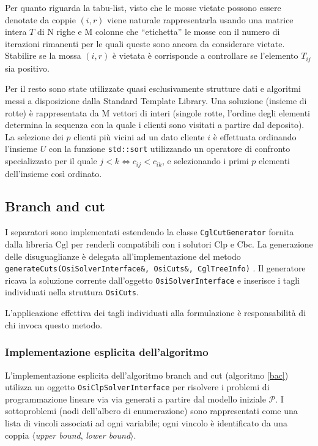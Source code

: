\documentclass[11pt,oneside,a4paper]{article}
\begin{document}
Per quanto riguarda la tabu-list, visto che le mosse vietate possono essere denotate da coppie
$(i,r)$ viene naturale rappresentarla usando una matrice intera $T$ di N righe e M colonne
che ``etichetta'' le mosse con il numero di iterazioni rimanenti per le quali queste sono ancora da
considerare vietate. Stabilire se la mossa $(i,r)$ è vietata è corrisponde a controllare se
l'elemento $T_{ij}$ sia positivo.

Per il resto sono state utilizzate quasi esclusivamente strutture dati e algoritmi messi a
disposizione dalla Standard Template Library. Una soluzione (insieme di rotte) è rappresentata da M vettori
di interi (singole rotte, l'ordine degli elementi determina la sequenza con la quale i clienti sono visitati
a partire dal deposito). La selezione dei $p$ clienti più vicini ad un dato cliente $i$ è effettuata
ordinando l'insieme $U$ con la funzione \texttt{std::sort} utilizzando un operatore di
confronto specializzato per il quale $j<k \iff c_{ij} < c_{ik}$, e selezionando i primi 
$p$ elementi dell'insieme così ordinato.

\subsection{Branch and cut}
I separatori sono implementati estendendo la classe \texttt{CglCutGenerator} fornita dalla
libreria Cgl per renderli compatibili con i solutori Clp e Cbc. La generazione
delle disuguaglianze è delegata all'implementazione del metodo
\texttt{generateCuts(OsiSolverInterface\&, OsiCuts\&, CglTreeInfo)}
. Il generatore ricava la soluzione corrente dall'oggetto \texttt{OsiSol\-verIn\-ter\-fa\-ce} e 
inserisce i tagli individuati nella struttura \texttt{OsiCuts}.

L'applicazione effettiva dei tagli individuati alla formulazione è responsabilità di chi invoca questo metodo.

\subsubsection{Implementazione esplicita dell'algoritmo}
L'implementazione esplicita dell'algoritmo branch and cut (algoritmo \ref{bac}) utilizza un
oggetto \texttt{OsiClpSolverInterface} per risolvere i problemi di programmazione lineare via via
generati a partire dal modello iniziale $\mathcal{P}$.
I sottoproblemi (nodi dell'albero di enumerazione) sono rappresentati come una lista
di vincoli associati ad ogni variabile; ogni vincolo è identificato da una coppia $\langle$\emph{upper bound},
\emph{lower bound}$\rangle$.
\end{document}
